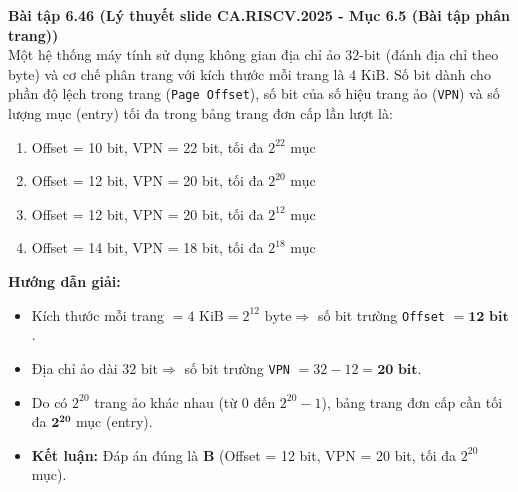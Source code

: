 \textbf{Bài tập 6.46 (Lý thuyết slide CA.RISCV.2025 - Mục 6.5 (Bài tập phân trang))}\\
Một hệ thống máy tính sử dụng không gian địa chỉ ảo $32\text{-bit}$ (đánh địa chỉ theo byte) và cơ chế phân trang với kích thước mỗi trang là $4\text{ KiB}$. Số bit dành cho phần độ lệch trong trang (\texttt{Page Offset}), số bit của số hiệu trang ảo (\texttt{VPN}) và số lượng mục (entry) tối đa trong bảng trang đơn cấp lần lượt là:
\begin{enumerate}[label=\Alph*.]
    \item Offset = 10 bit, VPN = 22 bit, tối đa $2^{22}$ mục
    \item Offset = 12 bit, VPN = 20 bit, tối đa $2^{20}$ mục
    \item Offset = 12 bit, VPN = 20 bit, tối đa $2^{12}$ mục
    \item Offset = 14 bit, VPN = 18 bit, tối đa $2^{18}$ mục
\end{enumerate}
\textbf{Hướng dẫn giải:}
\begin{itemize}
    \item Kích thước mỗi trang $= 4\text{ KiB} = 2^{12}\text{ byte} \Rightarrow$ số bit trường \texttt{Offset} $= \mathbf{12\text{ bit}}$.
    \item Địa chỉ ảo dài $32\text{ bit} \Rightarrow$ số bit trường \texttt{VPN} $= 32 - 12 = \mathbf{20\text{ bit}}$.
    \item Do có $2^{20}$ trang ảo khác nhau (từ $0$ đến $2^{20}-1$), bảng trang đơn cấp cần tối đa $\mathbf{2^{20}}$ mục (entry).
    \item \textbf{Kết luận:} Đáp án đúng là \textbf{B} (Offset = 12 bit, VPN = 20 bit, tối đa $2^{20}$ mục).
\end{itemize}

